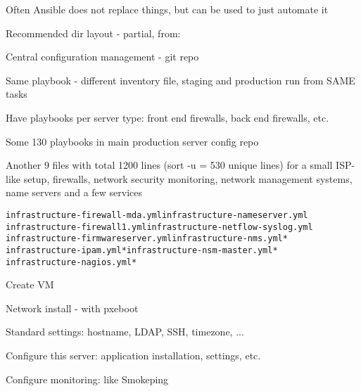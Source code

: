 \documentclass[18pt,landscape,a4paper,footrule]{foils}
\begin{document}
Often Ansible does not replace things, but can be used to just automate it



Recommended dir layout - partial, from:\\


\begin{list2}
\item Central configuration management - git repo
\item Same playbook - different inventory file, staging and production run from SAME tasks
\item Have playbooks per server type: front end firewalls, back end firewalls, etc.
\item Some 130 playbooks in main production server config repo
\item Another 9 files with total 1200 lines (sort -u = 530 unique lines) for a small ISP-like setup, firewalls, network security monitoring, network management systems, name servers and a few services
\begin{alltt}
infrastructure-firewall-mda.yml		infrastructure-nameserver.yml
infrastructure-firewall1.yml		infrastructure-netflow-syslog.yml
infrastructure-firmwareserver.yml	infrastructure-nms.yml*
infrastructure-ipam.yml*		infrastructure-nsm-master.yml*
infrastructure-nagios.yml*
\end{alltt}
\end{list2}


\begin{list2}
\item Create VM
\item Network install - with pxeboot
\item Standard settings: hostname, LDAP, SSH, timezone,  ...
\item Configure this server: application installation, settings, etc.
\item Configure monitoring: like Smokeping
\end{list2}


\end{document}
